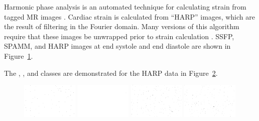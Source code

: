 \begin{figure}[h]
\label{fig:SPAMM}
\end{figure}

Harmonic phase analysis is an automated technique for calculating strain from tagged MR images \cite{Osman1999a}.  Cardiac strain is calculated from ``HARP'' images, which are the result of filtering in the Fourier domain.  Many versions of this algorithm require that these images be unwrapped prior to strain calculation \cite{Venkatesh2010, Venkatesh2011}.  SSFP, SPAMM, and HARP images at end systole and end diastole are shown in Figure~\ref{fig:SPAMM}.

The , , and  classes are demonstrated for the HARP data in Figure~\ref{fig:Exploring_HARP_Data}.

\begin{figure}[h]
\center
\includegraphics[trim = 100px 50px 110px 30px, clip, width=0.24\textwidth]{images/harp/03a_residue.png}
\includegraphics[trim = 100px 50px 110px 30px, clip, width=0.24\textwidth]{images/harp/03d_quality.png}
\includegraphics[trim = 100px 50px 110px 30px, clip, width=0.24\textwidth]{images/harp/03b_irrotational.png}
\includegraphics[trim = 100px 50px 110px 30px, clip, width=0.24\textwidth]{images/harp/03c_rotational.png}

\label{fig:Exploring_HARP_Data}
\end{figure}


